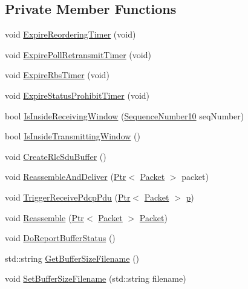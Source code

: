 \subsection*{Private Member Functions}
\begin{DoxyCompactItemize}
\item 
void \hyperlink{classns3_1_1LteRlcAm_a5ad4b058f9936aefde06a1787340e448}{Expire\+Reordering\+Timer} (void)
\item 
void \hyperlink{classns3_1_1LteRlcAm_a1fa21fbf53996368b8aeea6ed63f5c53}{Expire\+Poll\+Retransmit\+Timer} (void)
\item 
void \hyperlink{classns3_1_1LteRlcAm_ab21792f74446b1f4990e22c1113f8b2c}{Expire\+Rbs\+Timer} (void)
\item 
void \hyperlink{classns3_1_1LteRlcAm_a8388fe48c85820f1ea9606a8b04d28cb}{Expire\+Status\+Prohibit\+Timer} (void)
\item 
bool \hyperlink{classns3_1_1LteRlcAm_a278f6dd09bf7c65bd85fab4ece7ff11a}{Is\+Inside\+Receiving\+Window} (\hyperlink{classns3_1_1SequenceNumber10}{Sequence\+Number10} seq\+Number)
\item 
bool \hyperlink{classns3_1_1LteRlcAm_a4ddef60c579cc83d5df3a065b046f215}{Is\+Inside\+Transmitting\+Window} ()
\item 
void \hyperlink{classns3_1_1LteRlcAm_a43e97500d5362e00686d8e964a99a8a3}{Create\+Rlc\+Sdu\+Buffer} ()
\item 
void \hyperlink{classns3_1_1LteRlcAm_ada1201339d0a54e50adc27b09d3c5c1e}{Reassemble\+And\+Deliver} (\hyperlink{classns3_1_1Ptr}{Ptr}$<$ \hyperlink{classns3_1_1Packet}{Packet} $>$ packet)
\item 
void \hyperlink{classns3_1_1LteRlcAm_aebd583364a819e0451977d0fd44c588d}{Trigger\+Receive\+Pdcp\+Pdu} (\hyperlink{classns3_1_1Ptr}{Ptr}$<$ \hyperlink{classns3_1_1Packet}{Packet} $>$ \hyperlink{lte__link__budget__x2__handover__measures_8m_ac9de518908a968428863f829398a4e62}{p})
\item 
void \hyperlink{classns3_1_1LteRlcAm_a5ea384eb8654434de22432e79ee60364}{Reassemble} (\hyperlink{classns3_1_1Ptr}{Ptr}$<$ \hyperlink{classns3_1_1Packet}{Packet} $>$ \hyperlink{classns3_1_1Packet}{Packet})
\item 
void \hyperlink{classns3_1_1LteRlcAm_ad81917dde659b1c241aa8d22013c8f4b}{Do\+Report\+Buffer\+Status} ()
\item 
std\+::string \hyperlink{classns3_1_1LteRlcAm_a26db879ec13c45e2c93072c80ff3ae1b}{Get\+Buffer\+Size\+Filename} ()
\item 
void \hyperlink{classns3_1_1LteRlcAm_a8dc824904cb52c426acc6b778c05eab5}{Set\+Buffer\+Size\+Filename} (std\+::string filename)

\end{DoxyCompactItemize}
